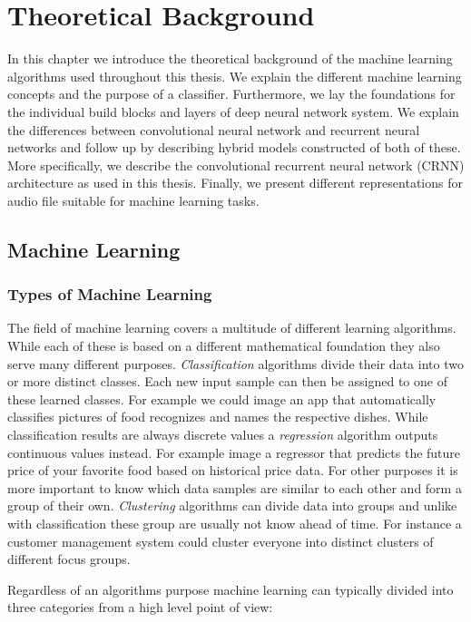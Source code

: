 \section{Theoretical Background}
\label{sec:theoretical_background}
In this chapter we introduce the theoretical background of the machine learning algorithms used throughout this thesis. We explain the different machine learning concepts and the purpose of a classifier. Furthermore, we lay the foundations for the individual build blocks and layers of deep neural network system. We explain the differences between convolutional neural network and recurrent neural networks and follow up by describing hybrid models constructed of both of these. More specifically, we describe the convolutional recurrent neural network (CRNN) architecture as used in this thesis. Finally, we present different representations for audio file suitable for machine learning tasks.

\subsection{Machine Learning}
\subsubsection{Types of Machine Learning}
The field of machine learning covers a multitude of different learning algorithms. While each of these is based on a different mathematical foundation they also serve many different purposes. \textit{Classification} algorithms divide their data into two or more distinct classes. Each new input sample can then be assigned to one of these learned classes. For example we could image an app that automatically classifies pictures of food recognizes and names the respective dishes. While classification results are always discrete values a \textit{regression} algorithm outputs continuous values instead. For example image a regressor that predicts the future price of your favorite food based on historical price data. For other purposes it is more important to know which data samples are similar to each other and form a group of their own. \textit{Clustering} algorithms can divide data into groups and unlike with classification these group are usually not know ahead of time. For instance a customer management system could cluster everyone into distinct clusters of different focus groups.

Regardless of an algorithms purpose machine learning can typically divided into three categories from a high level point of view:

